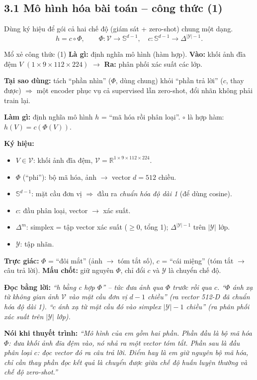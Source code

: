 \documentclass[12pt,a4paper]{article}
\begin{document}
\subsection{3.1 Mô hình hóa bài toán -- công thức (1)}
Dùng ký hiệu để gói cả hai chế độ (giám sát + zero-shot) chung một dạng.
\begin{equation}
h = c \circ \Phi, \qquad \Phi:\mathcal{V}\to\mathbb{S}^{d-1},\quad c:\mathbb{S}^{d-1}\to\Delta^{|\mathcal{Y}|-1}.
\label{eq:comp}
\end{equation}
\begin{ctbox}{Mổ xẻ công thức (1)}
\textbf{Là gì:} định nghĩa mô hình (hàm hợp). \quad\textbf{Vào:} khối ảnh đĩa đệm $V$ $(1{\times}9{\times}112{\times}224)$ $\to$ \textbf{Ra:} phân phối xác suất các lớp.

\textbf{Tại sao dùng:} tách ``phần nhìn'' ($\Phi$, dùng chung) khỏi ``phần trả lời'' ($c$, thay được) $\Rightarrow$ một encoder phục vụ cả supervised lẫn zero-shot, đổi nhãn không phải train lại.

\textbf{Làm gì:} định nghĩa mô hình $h$ = ``mã hóa rồi phân loại''. $\circ$ là hợp hàm: $h(V)=c(\Phi(V))$.

\textbf{Ký hiệu:}
\begin{itemize}[leftmargin=1.4em,itemsep=1pt]
\item $V\in\mathcal{V}$: khối ảnh đĩa đệm, $\mathcal{V}=\mathbb{R}^{1\times9\times112\times224}$.
\item $\Phi$ (``phi''): bộ mã hóa, ảnh $\to$ vector $d=512$ chiều.
\item $\mathbb{S}^{d-1}$: mặt cầu đơn vị $\Rightarrow$ đầu ra \emph{chuẩn hóa độ dài 1} (để dùng cosine).
\item $c$: đầu phân loại, vector $\to$ xác suất.
\item $\Delta^{m}$: simplex = tập vector xác suất ($\ge0$, tổng 1); $\Delta^{|\mathcal{Y}|-1}$ trên $|\mathcal{Y}|$ lớp.
\item $\mathcal{Y}$: tập nhãn.
\end{itemize}
\textbf{Trực giác:} $\Phi$ = ``đôi mắt'' (ảnh $\to$ tóm tắt số), $c$ = ``cái miệng'' (tóm tắt $\to$ câu trả lời). \textbf{Mấu chốt:} giữ nguyên $\Phi$, chỉ đổi $c$ và $\mathcal{Y}$ là chuyển chế độ.

\textbf{Đọc bằng lời:} \emph{``h bằng c hợp $\Phi$'' -- tức đưa ảnh qua $\Phi$ trước rồi qua $c$. ``$\Phi$ ánh xạ từ không gian ảnh $\mathcal{V}$ vào mặt cầu đơn vị $d{-}1$ chiều'' (ra vector 512-D đã chuẩn hóa độ dài 1). ``$c$ ánh xạ từ mặt cầu đó vào simplex $|\mathcal{Y}|{-}1$ chiều'' (ra phân phối xác suất trên $|\mathcal{Y}|$ lớp).}

\textbf{Nói khi thuyết trình:} \emph{``Mô hình của em gồm hai phần. Phần đầu là bộ mã hóa $\Phi$: đưa khối ảnh đĩa đệm vào, nó nhả ra một vector tóm tắt. Phần sau là đầu phân loại $c$: đọc vector đó ra câu trả lời. Điểm hay là em giữ nguyên bộ mã hóa, chỉ cần thay phần đọc kết quả là chuyển được giữa chế độ huấn luyện thường và chế độ zero-shot.''}
\end{ctbox}
\end{document}
